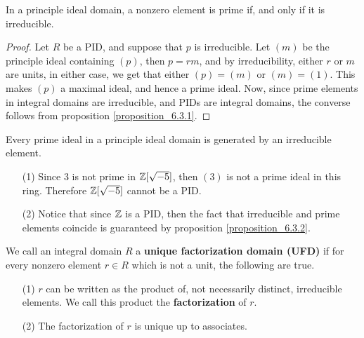 \begin{proposition}\label{proposition_6.3.2}
  In a principle ideal domain, a nonzero element is prime if, and only if it
  is irreducible.
\end{proposition}
\begin{proof}
  Let $R$ be a PID, and suppose that $p$ is irreducible. Let $(m)$ be the
  principle ideal containing $(p)$, then $p=rm$, and by irreducibility, either
  $r$ or $m$ are units, in either case, we get that either $(p)=(m)$ or
  $(m)=(1)$. This makes $(p)$ a maximal ideal, and hence a prime
  ideal. Now, since prime elements in integral domains are
  irreducible, and PIDs are integral domains, the converse follows
  from proposition \ref{proposition_6.3.1}.
\end{proof}
\begin{corollary}
  Every prime ideal in a principle ideal domain is generated by an
  irreducible element.
\end{corollary}

\begin{example}\label{example_6.7}
  \begin{enumerate}
    \item[(1)] Since $3$ is not prime in  $\mathbb{Z}[\sqrt{-5}]$, then $(3)$ is not
      a prime ideal in this ring. Therefore $\mathbb{Z}[\sqrt{-5}]$ cannot be a
      PID.

    \item[(2)] Notice that since $\mathbb{Z}$ is a PID, then the fact that
      irreducible and prime elements coincide is guaranteed by proposition
      \ref{proposition_6.3.2}.
  \end{enumerate}
\end{example}

\begin{definition}
  We call an integral domain $R$ a  \textbf{unique factorization domain (UFD)}
  if for every nonzero element $r \in R$ which is not a unit, the following
  are true.
  \begin{enumerate}
    \item[(1)] $r$ can be written as the product of, not necessarily distinct,
      irreducible elements. We call this product the
      \textbf{factorization} of $r$.

    \item[(2)] The factorization of $r$ is unique up to associates.
  \end{enumerate}
\end{definition}

